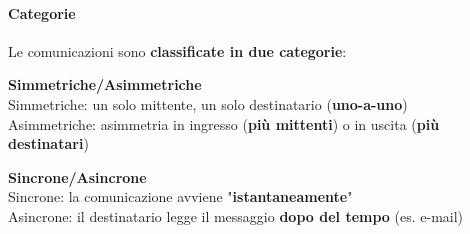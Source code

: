\documentclass[10pt]{report}
\begin{document}
\paragraph{Categorie} Le comunicazioni sono \textbf{classificate in due categorie}:
\begin{list}{}{}
	\item \textbf{Simmetriche/Asimmetriche}\\
	Simmetriche: un solo mittente, un solo destinatario (\textbf{uno-a-uno})\\
	Asimmetriche: asimmetria in ingresso (\textbf{più mittenti}) o in uscita (\textbf{più destinatari})
	\item \textbf{Sincrone/Asincrone}\\
	Sincrone: la comunicazione avviene "\textbf{istantaneamente}"\\
	Asincrone: il destinatario legge il messaggio \textbf{dopo del tempo} (es. e-mail)
\end{list}
\pagebreak
\end{document}
